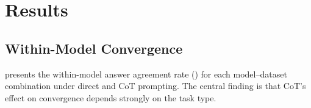 \section{Results}
\label{sec:results}

\subsection{Within-Model Convergence}
\label{sec:within}

 presents the within-model answer agreement rate (\aar) for each model--dataset combination under direct and CoT prompting. The central finding is that CoT's effect on convergence depends strongly on the task type.

\begin{table}[t]
\centering
\caption{Within-model answer agreement rate (\aar) under direct and CoT prompting. Higher \aar indicates more convergent outputs. We report mean $\pm$ standard deviation across 30 questions per dataset. Significant differences ($p < 0.05$, Wilcoxon signed-rank test) are marked with *.}
\label{tab:within}
\end{table}

